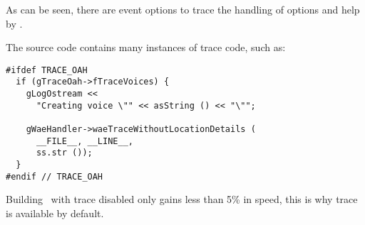 As can be seen, there are event options to trace the handling of options and help by \xmlToLy.

The source code contains many instances of trace code, such as:
\begin{lstlisting}[language=CPlusPlus]
#ifdef TRACE_OAH
  if (gTraceOah->fTraceVoices) {
    gLogOstream <<
      "Creating voice \"" << asString () << "\"";

    gWaeHandler->waeTraceWithoutLocationDetails (
      __FILE__, __LINE__,
      ss.str ());
  }
#endif // TRACE_OAH
\end{lstlisting}

Building \xmlToLy\ with trace disabled only gains less than 5\% in speed, this is why trace is available by default.


